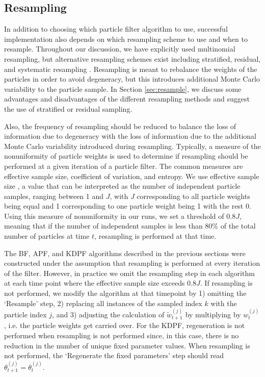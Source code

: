 \documentclass{elsarticle}
\begin{document}
\subsection{Resampling \label{sec:advice}}

In addition to choosing which particle filter algorithm to use, successful implementation also depends on which resampling scheme to use and when to resample. Throughout our discussion, we have explicitly used multinomial resampling, but alternative resampling schemes exist including stratified, residual, and systematic resampling \citep{Douc:Capp:Moul:comp:2005}. Resampling is meant to rebalance the weights of the particles in order to avoid degeneracy, but this introduces additional Monte Carlo variability to the particle sample. In Section \ref{sec:resample}, we discuss some advantages and disadvantages of the different resampling methods and suggest the use of stratified or residual sampling.

Also, the frequency of resampling should be reduced to balance the loss of information due to degeneracy with the loss of information due to the additional Monte Carlo variability introduced during resampling. Typically, a measure of the nonuniformity of particle weights is used to determine if resampling should be performed at a given iteration of a particle filter. The common measures are effective sample size, coefficient of variation, and entropy. We use effective sample size \citep{Liu:Chen:Wong:reje:1998}, a value that can be interpreted as the number of independent particle samples, ranging between 1 and $J$, with $J$ corresponding to all particle weights being equal and 1 corresponding to one particle weight being 1 with the rest 0. Using this measure of nonuniformity in our runs, we set a threshold of $0.8J$, meaning that if the number of independent samples is less than 80\% of the total number of particles at time $t$, resampling is performed at that time.

The BF, APF, and KDPF algorithms described in the previous sections were constructed under the assumption that resampling is performed at every iteration of the filter. However, in practice we omit the resampling step in each algorithm at each time point where the effective sample size exceeds $0.8J$. If resampling is not performed, we modify the algorithm at that timepoint by 1) omitting the `Resample' step, 2) replacing all instances of the sampled index $k$ with the particle index $j$, and 3) adjusting the calculation of $\tilde{w}_{t+1}^{(j)}$ by multiplying by $w_t^{(j)}$, i.e. the particle weights get carried over. For the KDPF, regeneration is not performed when resampling is not performed since, in this case, there is no reduction in the number of unique fixed parameter values. When resampling is not performed, the `Regenerate the fixed parameters' step should read $\theta_{t+1}^{(j)} = \theta_t^{(j)}$.
\end{document}
